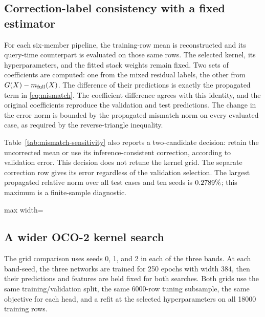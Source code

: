 \subsection{Correction-label consistency with a fixed estimator}
For each six-member pipeline, the training-row mean is reconstructed and
its query-time counterpart is evaluated on those same rows. The
selected kernel, its hyperparameters, and the fitted stack weights remain
fixed. Two sets of coefficients are computed: one from the mixed
residual labels, the other from $G(X)-m_{\rm full}(X)$. The difference of
their predictions is exactly the propagated term in \eqref{eq:mismatch}.
The coefficient difference agrees with this identity, and the original
coefficients reproduce the validation and test predictions. The change in the error norm is bounded by the propagated mismatch norm
on every evaluated case, as required by the reverse-triangle inequality.

Table~\ref{tab:mismatch-sensitivity} also reports a two-candidate decision:
retain the uncorrected mean or use its inference-consistent correction,
according to validation error. This decision does not retune the kernel
grid. The separate correction row gives its error regardless of the validation
selection. The largest propagated relative norm over
all test cases and ten seeds is $0.2789\%$; this maximum is a finite-sample diagnostic.

\begin{table}[t]
\centering
\caption{Correction-label sensitivity, ten mechanics pipelines.
No neural training or stack-weight fitting is repeated. The kernel is the
one selected by the baseline pipeline.}
\label{tab:mismatch-sensitivity}
\begin{adjustbox}{max width=\linewidth}

\end{adjustbox}
\end{table}

\subsection{A wider OCO-2 kernel search}
The grid comparison uses seeds 0, 1, and 2 in each of the three bands.
At each band-seed, the three networks are trained for 250 epochs with width
384, then their predictions and features are held fixed for both searches.
Both grids use the same training/validation split, the same 6000-row tuning
subsample, the same objective for each head, and a refit at the selected
hyperparameters on all 18000 training rows.

